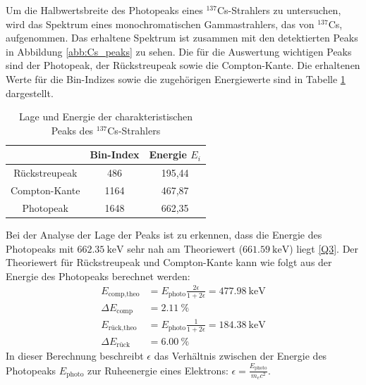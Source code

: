 Um die Halbwertsbreite des Photopeaks eines $^{137}$Cs-Strahlers zu untersuchen,
wird das Spektrum eines monochromatischen Gammastrahlers, das von $^{137}$Cs,
aufgenommen. Das erhaltene Spektrum ist zusammen mit den detektierten Peaks in
Abbildung \ref{abb:Cs_peaks} zu sehen. Die für die Auswertung wichtigen Peaks sind der
Photopeak, der Rückstreupeak sowie die Compton-Kante. Die erhaltenen Werte für die
Bin-Indizes sowie die zugehörigen Energiewerte sind in Tabelle \ref{tab:Cs_peaks}
dargestellt.
\FloatBarrier
\begin{table}
    \centering
    \caption{Lage und Energie der charakteristischen Peaks des $^{137}$Cs-Strahlers}
    \label{tab:Cs_peaks}
    \begin{tabular}{ c c c }
        \toprule
        & {Bin-Index} & {Energie $E_i$}      \\
        \midrule
        {Rückstreupeak} & 486  & 195,44      \\
        {Compton-Kante} & 1164 & 467,87      \\
        {Photopeak}     & 1648 & 662,35      \\
        \bottomrule
    \end{tabular}
\end{table}
\FloatBarrier
Bei der Analyse der Lage der Peaks ist zu erkennen, dass die Energie des Photopeaks mit $\SI{662,35}{\kilo \electronvolt}$ sehr nah am Theoriewert ($\SI{661,59}{\kilo \electronvolt}$) liegt \ref{Q3}.
Der Theoriewert für Rückstreupeak und Compton-Kante kann wie folgt aus der Energie des Photopeaks berechnet werden:
\begin{align*}
    E_{\text{comp,theo}} &= E_\text{photo} \frac{2\epsilon}{1+2\epsilon} = \SI{477,98}{\kilo\electronvolt} \\ \Delta E_\text{comp} &= \SI{2,11}{\percent} \\
    E_{\text{rück,theo}} &= E_\text{photo} \frac{1}{1+2\epsilon} = \SI{184,38}{\kilo\electronvolt} \\
    \Delta E_\text{rück} &= \SI{6,00}{\percent}
\end{align*}
In dieser Berechnung beschreibt $\epsilon$ das Verhältnis zwischen der Energie des Photopeaks $E_\text{photo}$ zur Ruheenergie eines Elektrons: $\epsilon = \frac{E_\text{photo}}{m_e c^2}$.

